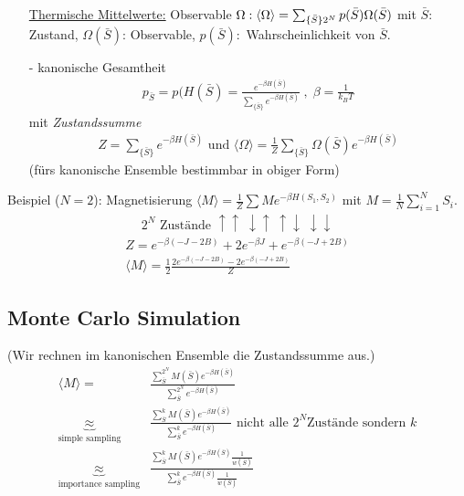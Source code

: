 \documentclass[12pt]{article}
\begin{document}
\begin{itemize}
\underline{Thermische Mittelwerte:} Observable $\Omega: \langle \Omega \rangle= \sum_{ \{\bar{S} \} \\ 2^N }  p(\bar{S}) \Omega(\bar{S})$ mit $\bar{S}:$ Zustand, $\Omega(\bar{S})$: Observable, $p(\bar{S}):$ Wahrscheinlichkeit von $\bar{S}$. %

\item[-] kanonische Gesamtheit 
\begin{align}
p_{\bar{S}}=p(H(\bar{S})= \frac{e^{- \beta H(\bar{S})}}{\sum_{\{ \bar{S} \} } e^{-\beta H(\bar{S})}} \; , \; \beta = \frac{1}{k_BT}
\end{align}
mit \textit{Zustandssumme} 
\begin{align}
Z= \sum_{ \{\bar{S}\} } e^{- \beta H(\bar{S})} \mbox{ und } \langle \Omega \rangle = \frac{1}{Z}  \sum_{ \{\bar{S}\} } \Omega(\bar{S}) e^{- \beta H(\bar{S})}
\end{align} (fürs kanonische Ensemble bestimmbar in obiger Form)


\end{itemize}
Beispiel ($N=2$): 
Magnetisierung $\langle M \rangle = \frac{1}{Z} \sum M e^{- \beta H(S_1,S_2)}$ mit $M= \frac{1}{N} \sum_{i=1}^N S_i$.
\begin{align*}
2^N \mbox{ Zustände } \uparrow \uparrow \; \downarrow \uparrow \; \uparrow \downarrow \; \downarrow \downarrow
\end{align*}
\begin{align*}
Z= e^{-\beta (-J -2B)} + 2 e^{-\beta J} + e^{- \beta (-J +2B)} \\
\langle M \rangle = \frac{1}{2} \frac{2 e^{-\beta (-J - 2B)} - 2 e^{-\beta (-J + 2B)}}{Z}
\end{align*} %

\subsection{Monte Carlo Simulation}
(Wir rechnen im kanonischen Ensemble die Zustandssumme aus.)
\begin{align}
\langle M \rangle =& \frac{\sum^{2^N}_{\bar{S}} M(\bar{S}) e^{-\beta H(\bar{S})}}{\sum^{2^N}_{\bar{S}} e^{-\beta H(\bar{S})}}  \\ \underbrace{\approx}_\text{simple sampling} &
\frac{\sum^{k}_{\bar{S}} M(\bar{S}) e^{-\beta H(\bar{S})}}{\sum^{k}_{\bar{S}} e^{-\beta H(\bar{S})}} \mbox{ nicht alle } 2^N \mbox{Zustände sondern } k \\
\underbrace{\approx}_\text{importance sampling} & 
\frac{\sum^{k}_{\bar{S}} M(\bar{S}) e^{-\beta H(\bar{S})} \frac{1}{w(\bar{S})}}{\sum^{k}_{\bar{S}} e^{-\beta H(\bar{S})} \frac{1}{w(\bar{S})}}
\end{align}
\end{document}
